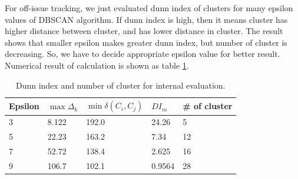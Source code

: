 For off-issue tracking, we just evaluated dunn index of clusters for many epsilon values of DBSCAN algorithm.
If dunn index is high, then it means cluster has higher distance between cluster, and has lower distance in cluster.
The result shows that smaller epsilon makes greater dunn index, but number of cluster is decreasing. So,
we have to decide appropriate epsilon value for better result. Numerical result of calculation is shown as table \ref{table:dunnindex}.
\begin{table}[!htbp]
  \begin{tabular}{l|l|l|l|l}
  Epsilon   & $\max \Delta_{k}$ & $\min \delta(C_{i}, C_{j})$ & $DI_{m}$ & \# of cluster \\ \hline
  3 &  8.122 & 192.0 & 24.26 & 5 \\
  5 &  22.23 & 163.2 & 7.34 & 12 \\
  7 &  52.72 & 138.4 & 2.625 & 16  \\
  9 & 106.7 & 102.1 & 0.9564 & 28
  \end{tabular}
  \caption{Dunn index and number of cluster for internal evaluation.}
  \label{table:dunnindex}
\end{table}
